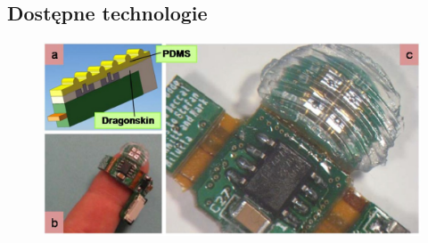 \documentclass[8pt]{beamer}
\begin{document}
		
	\subsection{Dostępne technologie}
		\begin{frame}
			\begin{center}
				\begin{figure}
					\includegraphics[width=\textwidth]{graphics/roughness_mems.jpg}
					\label{graph:mems}	
					\caption{ \cite{5420491}}
				\end{figure}
			\end{center}
		\end{frame}		
		
\end{document}
